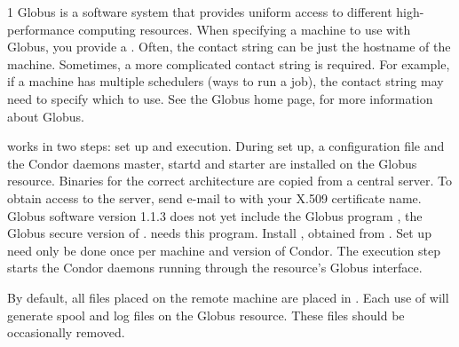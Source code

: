 \begin{ManPage}{\label{man-condor-glidein}}{1}
Globus is a software system that provides uniform access to
different high-performance computing resources.
When specifying a machine to use with Globus,
you provide a .
Often, the contact string can be just the hostname of the machine.
Sometimes, a more complicated contact string is required.
For example, if a machine has multiple schedulers (ways to run a job),
the contact string may need to specify which to use.
See the Globus home page,  for more
information about Globus.

 works in two steps: set up and execution.
During set up, a configuration file and the Condor daemons
master, startd and starter are installed on the Globus
resource.
Binaries for the correct architecture are copied from a central server.
To obtain access to the server,
send
e-mail to  with your X.509
certificate name.
Globus software version 1.1.3 does not yet include
the Globus program ,
the Globus secure version of .
 needs this program.
Install , obtained from
.
Set up need only be done once per machine and version of Condor.
The execution step starts the Condor daemons running through
the resource's Globus interface.

By default, all files placed on the remote machine are placed in
.
Each use of  will generate spool and log
files on the Globus resource.
These files should be occasionally removed.


\end{ManPage}
